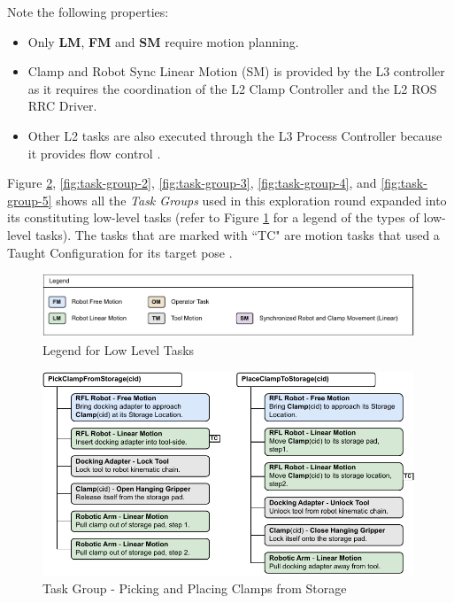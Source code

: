 Note the following properties:

\begin{itemize}
	\item Only \textbf{LM}, \textbf{FM }and \textbf{SM }require motion planning.

	\item Clamp and Robot Sync Linear Motion (SM) is provided by the L3 controller as it requires the coordination of the L2 Clamp Controller and the L2 ROS RRC Driver.

	\item Other L2 tasks are also executed through the L3 Process Controller because it provides flow control .

\end{itemize}
Figure \ref{fig:task-group-1}, \ref{fig:task-group-2}, \ref{fig:task-group-3}, \ref{fig:task-group-4}, and \ref{fig:task-group-5} shows all the \textit{Task Groups} used in this exploration round expanded into its constituting low-level tasks (refer to Figure \ref{fig:legend-for-low-level-tasks} for a legend of the types of low-level tasks). The tasks that are marked with ``TC" are motion tasks that used a Taught Configuration for its target pose .

\begin{figure}[!h]
    \centering
    \includegraphics[width=0.99\textwidth]{images/6a/motion-legend.pdf}
    \caption{Legend for Low Level Tasks}
    \label{fig:legend-for-low-level-tasks}
\end{figure}

\begin{figure}[!p]
    \centering
    \includegraphics[width=0.99\textwidth]{images/6a/lowleveltask-1.pdf}
    \caption{Task Group - Picking and Placing Clamps from Storage}
    \label{fig:task-group-1}
\end{figure}

